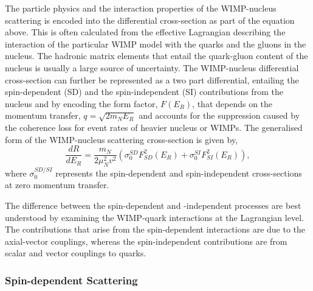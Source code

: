 The particle physics and the interaction properties of the WIMP-nucleus scattering is encoded into the differential cross-section as part of the equation above. This is often calculated from the effective Lagrangian describing the interaction of the particular WIMP model with the quarks and the gluons in the nucleus. The hadronic matrix elements that entail the quark-gluon content of the nucleus is usually a large source of uncertainty. The WIMP-nucleus differential cross-section can further be represented as a two part differential, entailing the spin-dependent (SD) and the spin-independent (SI) contributions from the nucleus and by encoding the form factor, $F(E_{R})$, that depends on the momentum transfer, $q=\sqrt{2m_{N}E_{R}}$ and accounts for the suppression caused by the coherence loss for event rates of heavier nucleus or WIMPs. The generalised form of the WIMP-nucleus scattering cross-section is given by,
%
\begin{equation} \label{eq:dependent_and_independent}
    \frac{dR}{dE_{R}} = \frac{m_{N}}{2\mu^{2}_{N}v^{2}} \left(\sigma_{0}^{SD}F^{2}_{SD}(E_{R}) + \sigma_{0}^{SI}F^{2}_{SI}(E_{R})\right),
\end{equation}
%
where $\sigma_{0}^{SD/SI}$ represents the spin-dependent and spin-independent cross-sections at zero momentum transfer.

The difference between the spin-dependent and -independent processes are best understood by examining the WIMP-quark interactions at the Lagrangian level. The contributions that arise from the spin-dependent interactions are due to the axial-vector couplings, whereas the spin-independent contributions are from scalar and vector couplings to quarks.

\subsubsection{Spin-dependent Scattering}
\label{subsec:SI_scatter}

